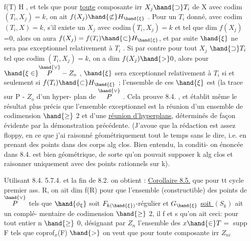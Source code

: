  f(T) \hand{$\subset$} H , et tels que pour \uline{toute} composante irr $X_j \hand{\supset} T_i$ de X
avec codim $(T_i,X_j)=k$, on ait $f(X_j)\hand{\not\subset} H_{\hand{\xi}}$ . Pour un $T_i$ donné,
 avec codim$(T_i,X)=k$, s'il existe un $X_j$ avec codim$(T_i,X_j)=k$
et tel que dim $f(X_j)$ =0, alors 
 on aura $f(X_j) = f(T_i) \hand{\subset} H_{\hand{\xi}}$, et par suite $\hand{\xi}$ ne
sera pas exceptionnel relativement à $T_i$ . Si par contre pour tout $X_j$
$\hand{\supset} T_i$ tel que codim $(T_i,X_j) = k$, on a dim $f(X_j) \hand{>} 0$, alors pour
$\hand{\xi \in} \overset{\hand{\vee}}{P} - Z_o$ , $\hand{\xi}$ sera exceptionnel relativement à $T_i$ si et seulement si
$f(T_i) \hand{\subset} H_{\hand{\xi}}$ ; l'ensemble de ces $\hand{\xi}$ est (la trace sur P - $Z_o$ d'\hand{)}un hyper-
plan de $\overset{\hand{\vee}}{P}$ . Cela prouve 8.4. , et établit même le résultat plus précis
que l'ensemble exceptionnel est la réunion d'un ensemble de codimension
$\hand{\geq}$ 2 et d'une \uline{réunion d'hyperplans}, déterminés de façon évidente par la
démonstration précédente. (J'avoue que la rédaction est assez floppy, \placedmargin{\hand{|}}
en ce que j'ai raisonné géométriquement tout le temps sans le dire, i.e.
en prenant des points dans des corps alg clos. Bien entendu, la conditi-
on énoncée dans 8.4. est bien géométrique, de sorte qu'on pouvait supposer
k alg clos et raisonner uniquement avec des points rationnels sur k).






 Utilisant 8.4. 5.7.4. et la fin de 8.2. on obtient : \uline{Corollaire 8.5.}  que pour tt cycle premier ass. R, on ait dim f(R)
 pour que l'ensemble (constructible) des points \unsure{$\xi$}
de $\overset{\hand{\vee}}{P}$ tels que $\hand{\phi_\xi}$ soit $F_{k(\hand{\xi})}$-régulier et $G_{\hand{\xi}}$ \uline{soit $(S_k)$}  ait un complé-
mentaire de codimension $\hand{\geq}$ 2, il f et s qu'on ait ceci: pour tout 
entier n $\hand{\geq}$ 0, désignant par $Z_n$ l'ensemble des $x \hand{\in} T$$=$ supp F tels que coprof$_x$(F) $\hand{>}$
 on veut que pour toute composante irr $Z_{ni}$


